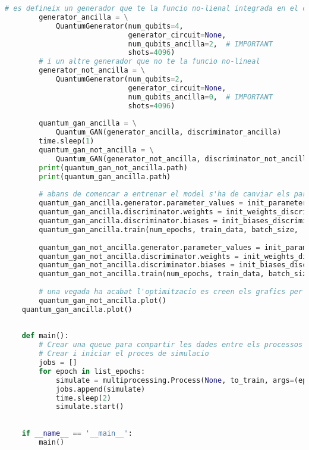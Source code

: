 \begin{lstlisting}[language=Python, caption=Executar els models amb multiprocessing]
		# es defineix un generador que te la funcio no-lienal integrada en el circuit
		generator_ancilla = \
			QuantumGenerator(num_qubits=4,
						  	 generator_circuit=None,
							 num_qubits_ancilla=2,  # IMPORTANT
						 	 shots=4096)
		# i un altre generador que no te la funcio no-lineal
		generator_not_ancilla = \
			QuantumGenerator(num_qubits=2,
	                         generator_circuit=None,
							 num_qubits_ancilla=0,  # IMPORTANT
							 shots=4096)
	
		quantum_gan_ancilla = \
			Quantum_GAN(generator_ancilla, discriminator_ancilla)
		time.sleep(1)
		quantum_gan_not_ancilla = \
			Quantum_GAN(generator_not_ancilla, discriminator_not_ancilla)
		print(quantum_gan_not_ancilla.path)
		print(quantum_gan_ancilla.path)
	
		# abans de comencar a entrenar el model s'ha de canviar els parametres als definits anteriorment
		quantum_gan_ancilla.generator.parameter_values = init_parameters_ancilla
		quantum_gan_ancilla.discriminator.weights = init_weights_discriminator
		quantum_gan_ancilla.discriminator.biases = init_biases_discriminator
		quantum_gan_ancilla.train(num_epochs, train_data, batch_size, .1, .1, False)
	
		quantum_gan_not_ancilla.generator.parameter_values = init_parameters_not_ancilla
		quantum_gan_not_ancilla.discriminator.weights = init_weights_discriminator
		quantum_gan_not_ancilla.discriminator.biases = init_biases_discriminator
		quantum_gan_not_ancilla.train(num_epochs, train_data, batch_size, .1, .1, False)
	
		# una vegada ha acabat l'optimitzacio es creen els grafics per compara l'eficiencia del models
		quantum_gan_not_ancilla.plot()
	quantum_gan_ancilla.plot()
	
	
	def main():
		# Crear una queue para compartir les dades entre els processos
		# Crear i iniciar el proces de simulacio
		jobs = []
		for epoch in list_epochs:
			simulate = multiprocessing.Process(None, to_train, args=(epoch,))
			jobs.append(simulate)
			time.sleep(2)
			simulate.start()
	
	
	if __name__ == '__main__':
		main()
\end{lstlisting}
